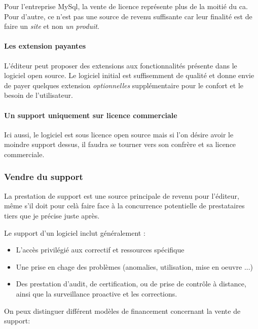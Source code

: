 			Pour l'entreprise MySql, la vente de licence représente plus de la moitié du \acrfull{ca}. Pour d'autre, ce n'est pas une source de revenu suffisante car leur finalité est de faire un \textit{site} et non \textit{un produit}.

			\paragraph{Les extension payantes\\}

			L'éditeur peut proposer des extensions aux fonctionnalités présente dans le logiciel open source. Le logiciel initial est suffisemment de qualité et donne envie de payer quelques extension \textit{optionnelles} supplémentaire pour le confort et le besoin de l'utilisateur.

			\paragraph{Un support uniquement sur licence commerciale\\}

			Ici aussi, le logiciel est sous licence open source mais si l'on désire avoir le moindre support dessus, il faudra se tourner vers son confrère et sa licence commerciale.

			\subsubsection{Vendre du support}

			La prestation de support est une source principale de revenu pour l'éditeur, même s'il doit pour celà faire face à la concurrence potentielle de prestataires tiers que je précise juste après.

			Le support d'un logiciel inclut généralement :

			\begin{itemize}[label=\textbullet, font=\LARGE \color{burntorange}]
				\item L'accès privilégié aux correctif et ressources spécifique
				\item Une prise en chage des problèmes (anomalies, utilisation, mise en oeuvre ...)
				\item Des prestation d'audit, de certification, ou de prise de contrôle à distance, ainsi que la surveillance proactive et les corrections.
			\end{itemize}

			On peux distinguer différent modèles de financement concernant la vente de support:

